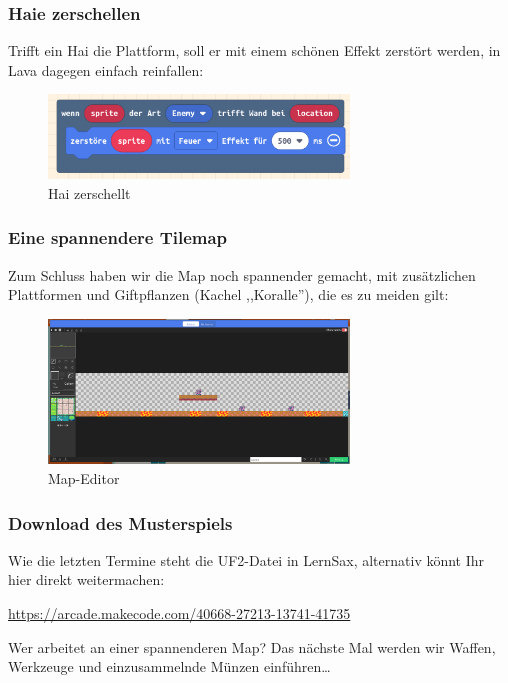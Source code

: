 \documentclass{beamer}
\begin{document}
\begin{frame}
 \frametitle{Haie zerschellen}
 
Trifft ein Hai die Plattform, soll er mit einem schönen Effekt zerstört werden, in Lava dagegen einfach reinfallen:
 
\begin{figure}
  \includegraphics[width=8cm]{game36.png}
  \caption{Hai zerschellt}
  \label{fig:game36}
\end{figure}
\end{frame}

\begin{frame}
 \frametitle{Eine spannendere Tilemap}

Zum Schluss haben wir die Map noch spannender gemacht, mit zusätzlichen Plattformen und Giftpflanzen (Kachel ,,Koralle''), die es zu meiden gilt:
 
\begin{figure}
  \includegraphics[width=8cm]{game37.png}
  \caption{Map-Editor}
  \label{fig:game37}
\end{figure}
\end{frame}

\begin{frame}
 \frametitle{Download des Musterspiels}

Wie die letzten Termine steht die UF2-Datei in LernSax, alternativ könnt Ihr hier direkt weitermachen:

\href{https://arcade.makecode.com/40668-27213-13741-41735}{https://arcade.makecode.com/40668-27213-13741-41735} 

Wer arbeitet an einer spannenderen Map? Das nächste Mal werden wir Waffen, Werkzeuge und einzusammelnde Münzen einführen…
\end{frame}
\end{document}
